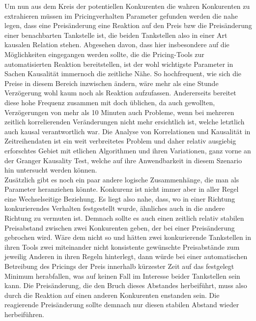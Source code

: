 \documentclass[12pt,a4paper,bibliography=totocnumbered,listof=totocnumbered]{scrartcl}
\begin{document}
Um nun aus dem Kreis der potentiellen Konkurenten die wahren Konkurenten zu extrahieren müssen im Pricingverhalten Parameter gefunden werden die nahe legen, dass eine Preisänderung eine Reaktion auf den Preis bzw die Preisänderung einer benachbarten Tankstelle ist, die beiden Tankstellen also in einer Art kausalen Relation stehen. Abgesehen davon, dass hier insbesondere auf die Möglichkeiten eingegangen werden sollte, die die Pricing-Tools zur automatisierten Reaktion bereitstellen, ist der wohl wichtigste Parameter in Sachen Kausalität immernoch die zeitliche Nähe. So hochfrequent, wie sich die Preise in diesem Bereich inzwischen ändern, wäre mehr als eine Stunde Verzögerung wohl kaum noch als Reaktion aufzufassen. Andererseits bereitet diese hohe Frequenz zusammen mit doch üblichen, da auch gewollten, Verzögerungen von mehr als 10 Minuten auch Probleme, wenn bei mehreren zeitlich korrelierenden Veränderungen nicht mehr ersichtlich ist, welche letztlich auch kausal verantwortlich war. Die Analyse von Korrelationen und Kausalität in Zeitreihendaten ist ein weit verbreitetes Problem und daher relativ ausgiebig erforschtes Gebiet mit etlichen Algorithmen und ihren Variationen, ganz vorne an der Granger Kausality Test, welche auf ihre Anwendbarkeit in diesem Szenario hin untersucht werden können.\\

Zusätzlich gibt es noch ein paar andere logische Zusammenhänge, die man als Parameter heranziehen könnte. Konkurenz ist nicht immer aber in aller Regel eine Wechselseitige Beziehung. Es liegt also nahe, dass, wo in einer Richtung konkurierendes Verhalten festgestellt wurde, ähnliches auch in die andere Richtung zu vermuten ist. Demnach sollte es auch einen zeitlich relativ stabilen Preisabstand zwischen zwei Konkurenten geben, der bei einer Preisänderung gebrochen wird. Wäre dem nicht so und hätten zwei konkurierende Tankstellen in ihren Tools zwei miteinander nicht konsistente gewünschte Preisabstände zum jeweilig Anderen in ihren Regeln hinterlegt, dann würde bei einer automatischen Betreibung des Pricings der Preis innerhalb kürzester Zeit auf das festgelegt Minimum herabfallen, was auf keinen Fall im Interesse beider Tankstellen sein kann. Die Preisänderung, die den Bruch dieses Abstandes herbeiführt, muss also durch die Reaktion auf einen anderen Konkurenten enstanden sein. Die reagierende Preisänderung sollte demnach nur diesen stabilen Abstand wieder herbeiführen.

\end{document}
